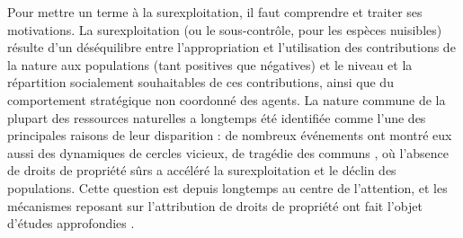 Pour mettre un terme à la surexploitation, il faut comprendre et traiter ses motivations. La surexploitation (ou le sous-contrôle, pour les espèces nuisibles) résulte d'un déséquilibre entre l'appropriation et l'utilisation des contributions de la nature aux populations (tant positives que négatives) et le niveau et la répartition socialement souhaitables de ces contributions, ainsi que du comportement stratégique non coordonné des agents. La nature commune de la plupart des ressources naturelles \citep{Gordon1954, smith_models_1969} a longtemps été identifiée comme l'une des principales raisons de leur disparition : de nombreux événements ont montré eux aussi des dynamiques de cercles vicieux, de tragédie des communs \citep{hardin_tragedy_1968}, où l'absence de droits de propriété sûrs a accéléré la surexploitation et le déclin des populations. Cette question est depuis longtemps au centre de l'attention, et les mécanismes reposant sur l'attribution de droits de propriété ont fait l'objet d'études approfondies \citep{libecap_tragedy_2009, costello_partial_2015, isaksen_tragedy_2019}.


